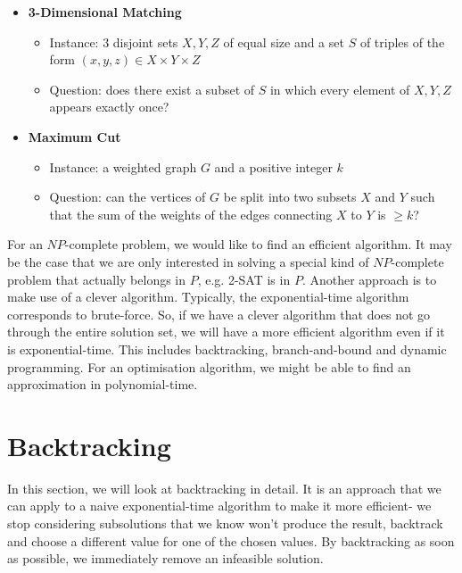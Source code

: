 \documentclass[a4paper, openany]{memoir}
\begin{document}
\begin{itemize}
        \item \textbf{3-Dimensional Matching}
        \begin{itemize}
            \item Instance: 3 disjoint sets $X, Y, Z$ of equal size and a set $S$ of triples of the form $(x, y, z) \in X \times Y \times Z$
            \item Question: does there exist a subset of $S$ in which every element of $X, Y, Z$ appears exactly once?
        \end{itemize}

        \item \textbf{Maximum Cut}
        \begin{itemize}
            \item Instance: a weighted graph $G$ and a positive integer $k$
            \item Question: can the vertices of $G$ be split into two subsets $X$ and $Y$ such that the sum of the weights of the edges connecting $X$ to $Y$ is $\geq k$?
        \end{itemize}
    \end{itemize}

    For an $NP$-complete problem, we would like to find an efficient algorithm. It may be the case that we are only interested in solving a special kind of $NP$-complete problem that actually belongs in $P$, e.g. 2-SAT is in $P$. Another approach is to make use of a clever algorithm. Typically, the exponential-time algorithm corresponds to brute-force. So, if we have a clever algorithm that does not go through the entire solution set, we will have a more efficient algorithm even if it is exponential-time. This includes backtracking, branch-and-bound and dynamic programming. For an optimisation algorithm, we might be able to find an approximation in polynomial-time.

    \section{Backtracking}
    In this section, we will look at backtracking in detail. It is an approach that we can apply to a naive exponential-time algorithm to make it more efficient- we stop considering subsolutions that we know won't produce the result, backtrack and choose a different value for one of the chosen values. By backtracking as soon as possible, we immediately remove an infeasible solution.
\end{document}
